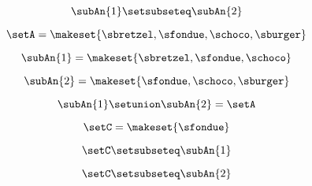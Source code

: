 \begin{forslides}
    \begin{equation}
        \label{eq:parallelism-070}
        \subAn{1} \setsubseteq \subAn{2}
    \end{equation}

    \begin{equation}
        \label{eq:parallelism-071}
        \setA = \makeset{ \sbretzel, \sfondue, \schoco, \sburger }
    \end{equation}

    \begin{equation}
        \label{eq:parallelism-071b}
        \subAn{1} = \makeset{ \sbretzel, \sfondue, \schoco }
    \end{equation}

    \begin{equation}
        \label{eq:parallelism-072}
        \subAn{2} = \makeset{\sfondue, \schoco, \sburger }
    \end{equation}

    \begin{equation}
        \label{eq:parallelism-073}
        \subAn{1} \setunion \subAn{2} = \setA
    \end{equation}

    \begin{equation}
        \label{eq:parallelism-074}
        \setC = \makeset{ \sfondue }
    \end{equation}

    \begin{equation}
        \label{eq:parallelism-075}
        \setC \setsubseteq \subAn{1}
    \end{equation}

    \begin{equation}
        \label{eq:parallelism-076}
        \setC \setsubseteq \subAn{2}
    \end{equation}
    
\begin{comment}
    \begin{equation}
        \label{eq:parallelism-077}
        \setC \setsubseteq \subAn{1} \setunion \subAn{2}
    \end{equation}

    \begin{equation}
        \label{eq:parallelism-078}
        \setC = \makeset{ \sbretzel }
    \end{equation}

    \begin{equation}
        \label{eq:parallelism-079}
        T = \Emptyset
    \end{equation}


\end{comment}
\end{forslides}
